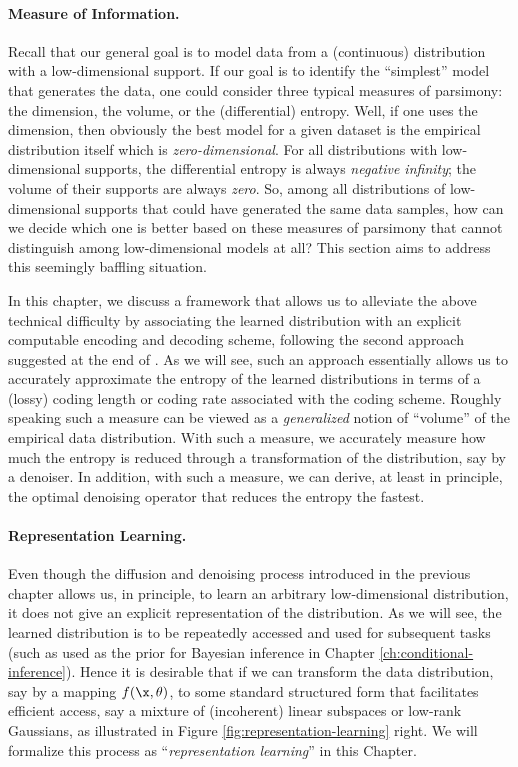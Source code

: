 \documentclass[../../book-main.tex]{subfiles}
\begin{document}
\paragraph{Measure of Information.}
Recall that our general goal is to model data from a (continuous) distribution
with a low-dimensional support. If our goal is to identify the ``simplest''
model that generates the data, one could consider three typical measures of
parsimony: the dimension, the volume, or the (differential) entropy. Well, if
one uses the dimension, then obviously the best model for a given dataset is the
empirical distribution itself which is {\em zero-dimensional}. For all distributions with low-dimensional supports, the differential entropy is always {\em negative infinity}; the volume of their supports are always {\em zero}. So, among all distributions of low-dimensional supports that could have generated the same data samples, how can we decide which one is better based on these measures of parsimony that cannot distinguish among low-dimensional models at all? This section aims to address this seemingly baffling situation.

In this chapter, we discuss a framework that allows us to alleviate the above technical difficulty by associating the learned distribution with an explicit computable encoding and decoding scheme, following the second approach suggested at the end of . As we will see, such an approach essentially allows us to accurately approximate the entropy of the learned distributions in terms of a (lossy) coding length or coding rate associated with the coding scheme. Roughly speaking such a measure can be viewed as a {\em generalized} notion of ``volume'' of the empirical data distribution. With such a measure, we accurately measure how much the entropy is reduced through a transformation of the distribution, say by a denoiser. In addition, with such a measure, we can derive, at least in principle, the optimal denoising operator that reduces the entropy the fastest. 


\paragraph{Representation Learning.}
Even though the diffusion and denoising process introduced in the previous chapter allows us, in principle, to learn an arbitrary low-dimensional distribution, it does not give an explicit representation of the distribution. As we will see, the learned distribution is to be repeatedly accessed and used for subsequent tasks (such as used as the prior for Bayesian inference in Chapter \ref{ch:conditional-inference}). Hence it is desirable that if we can transform the data distribution, say by a mapping $f(\x,\theta)$, to some standard structured form that facilitates efficient access, say a mixture of (incoherent) linear subspaces or low-rank Gaussians, as illustrated in Figure \ref{fig:representation-learning} right. We will formalize this process as ``{\em representation learning}'' in this Chapter.
\end{document}

